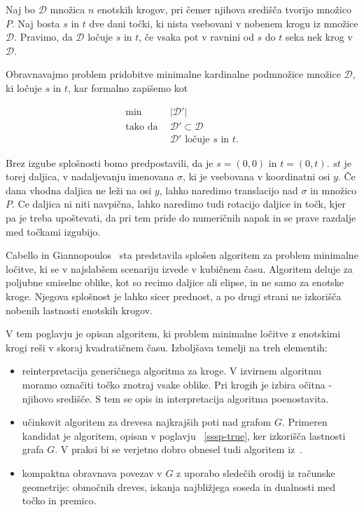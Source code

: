\documentclass[a4paper, 12pt]{book}
\newcommand{\D}{\ensuremath{\mathcal{D}}}
\begin{document}
Naj bo $\D$ množica $n$ enotskih krogov, pri čemer njihova središča tvorijo množico $P$. Naj bosta $s$ in $t$ dve dani točki, ki nista vsebovani v nobenem krogu iz množice $\D$. Pravimo, da $\D$ ločuje $s$ in $t$, če vsaka pot v ravnini od $s$ do $t$ seka nek krog v $\D$.

Obravnavajmo problem pridobitve minimalne kardinalne podmnožice množice $\D$, ki ločuje $s$ in $t$, kar formalno zapišemo kot 

\begin{align*}
	\min ~~		& |\D'|\\
	 \mbox{tako da}~~ & \D'\subset \D\\
				&	\D'\text{ ločuje $s$ in $t$}. 
\end{align*}

Brez izgube splošnosti bomo predpostavili, da je $s=(0,0)$ in $t=(0,t)$. $st$ je torej daljica, v nadaljevanju imenovana $\sigma$, ki je vsebovana v koordinatni osi $y$. Če dana vhodna daljica ne leži na osi $y$, lahko naredimo translacijo nad $\sigma$ in množico $P$. Ce daljica ni niti navpična, lahko naredimo tudi rotacijo daljice in točk, kjer pa je treba upoštevati, da pri tem pride do numeričnih napak in se prave razdalje med točkami izgubijo. 

Cabello in Giannopoulos~\cite{CG16} sta predstavila splošen algoritem za problem minimalne ločitve, ki se v najslabšem scenariju izvede v kubičnem času. Algoritem deluje za poljubne smiselne oblike, kot so recimo daljice ali elipse, in ne samo za enotske kroge. Njegova splošnost je lahko sicer prednost, a po drugi strani ne izkorišča nobenih lastnosti enotskih krogov.

V tem poglavju je opisan algoritem, ki problem minimalne ločitve z enotskimi krogi reši v skoraj kvadratičnem času. Izboljšava temelji na treh elementih:
\begin{itemize}
\item reinterpretacija generičnega algoritma za kroge. V izvirnem algoritmu moramo označiti točko znotraj vsake oblike. Pri krogih je izbira očitna - njihovo središče. S tem se opis in interpretacija algoritma poenostavita.
\item učinkovit algoritem za drevesa najkrajših poti nad grafom $G$. Primeren kandidat je algoritem, opisan v poglavju ~\ref{sssp-true}, ker izkorišča lastnosti grafa $G$. V praksi bi se verjetno dobro obnesel tudi algoritem iz~\cite{ChanS16}.
\item kompaktna obravnava povezav v $G$ z uporabo sledečih orodij iz računske geometrije: območnih dreves, iskanja najbližjega soseda in dualnosti med točko in premico. 
\end{itemize}
\end{document}
